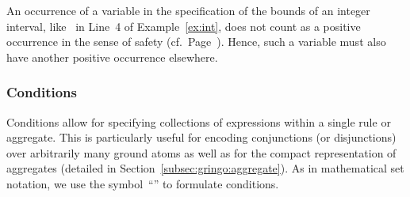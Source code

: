 \begin{Note}
An occurrence of a variable in the specification of the bounds
of an integer interval, like~ in Line~4 of Example~\ref{ex:int}, 
does not count as a positive occurrence
in the sense of safety (cf.\ Page~\pageref{pg:safe}).
Hence, such a variable must also have another positive occurrence elsewhere.
%
\end{Note}

\subsubsection{Conditions}\label{subsec:gringo:condition}
%
%
%
Conditions allow for specifying collections of expressions within a single rule or aggregate.
This is particularly useful for encoding conjunctions (or disjunctions) over
arbitrarily many ground atoms as well as for the compact representation of aggregates
(detailed in Section~\ref{subsec:gringo:aggregate}).
As in mathematical set notation,
we use the symbol~``\code{:}'' to formulate conditions.

